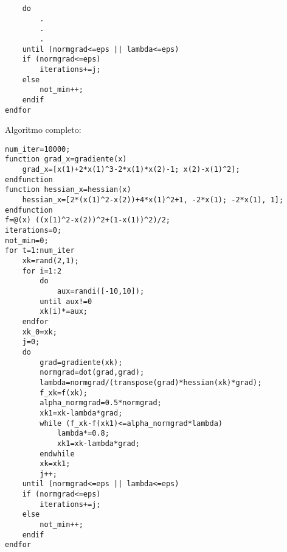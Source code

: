 \documentclass[a4paper, 12pt]{article}
\begin{document}
\begin{lstlisting}
    do
        .
        .
        .
    until (normgrad<=eps || lambda<=eps)
    if (normgrad<=eps)
        iterations+=j;
    else
        not_min++;
    endif
endfor
\end{lstlisting}
Algoritmo completo:
\begin{lstlisting}
num_iter=10000;
function grad_x=gradiente(x)
    grad_x=[x(1)+2*x(1)^3-2*x(1)*x(2)-1; x(2)-x(1)^2];
endfunction
function hessian_x=hessian(x)
    hessian_x=[2*(x(1)^2-x(2))+4*x(1)^2+1, -2*x(1); -2*x(1), 1];
endfunction
f=@(x) ((x(1)^2-x(2))^2+(1-x(1))^2)/2;
iterations=0;
not_min=0;
for t=1:num_iter
    xk=rand(2,1);
    for i=1:2
        do
            aux=randi([-10,10]);
        until aux!=0
        xk(i)*=aux;
    endfor
    xk_0=xk;
    j=0;
    do 
        grad=gradiente(xk);
        normgrad=dot(grad,grad);
        lambda=normgrad/(transpose(grad)*hessian(xk)*grad);
        f_xk=f(xk);
        alpha_normgrad=0.5*normgrad;
        xk1=xk-lambda*grad;
        while (f_xk-f(xk1)<=alpha_normgrad*lambda)
            lambda*=0.8;
            xk1=xk-lambda*grad;
        endwhile
        xk=xk1;         
        j++;
    until (normgrad<=eps || lambda<=eps)
    if (normgrad<=eps)
        iterations+=j;
    else
        not_min++;
    endif
endfor
\end{lstlisting}
\end{document}
